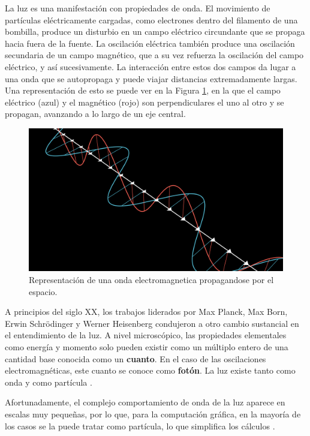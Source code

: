 La luz es una manifestación con propiedades de onda.
El movimiento de partículas eléctricamente cargadas, como electrones dentro del filamento de una bombilla, produce un disturbio en un campo eléctrico circundante que se propaga hacia fuera de la fuente.
La oscilación eléctrica también produce una oscilación secundaria de un campo magnético, que a su vez refuerza la oscilación del campo eléctrico, y así sucesivamente.
La interacción entre estos dos campos da lugar a una onda que se autopropaga y puede viajar distancias extremadamente largas.
Una representación de esto se puede ver en la Figura \ref{fig:electromagnetic-wave}, en la que el campo eléctrico (azul) y el magnético (rojo) son perpendiculares el uno al otro y se propagan, avanzando a lo largo de un eje central.

\begin{figure}[t]
    \centering
    \includegraphics[width=\textwidth]{electromagnetic_wave.png}
    \caption{Representación de una onda electromagnetica propagandose por el espacio.}
    \label{fig:electromagnetic-wave}
\end{figure}

A principios del siglo XX, los trabajos liderados por Max Planck, Max Born, Erwin Schrödinger y Werner Heisenberg condujeron a otro cambio sustancial en el entendimiento de la luz.
A nivel microscópico, las propiedades elementales como energía y momento solo pueden existir como un múltiplo entero de una cantidad base conocida como un \textbf{cuanto}.
En el caso de las oscilaciones electromagnéticas, este cuanto se conoce como \textbf{fotón}.
La luz existe tanto como onda y como partícula \cite{quantum-light}.

Afortunadamente, el complejo comportamiento de onda de la luz aparece en escalas muy pequeñas, por lo que, para la computación gráfica, en la mayoría de los casos se la puede tratar como partícula, lo que simplifica los cálculos \cite[p.~303]{rtr}.

